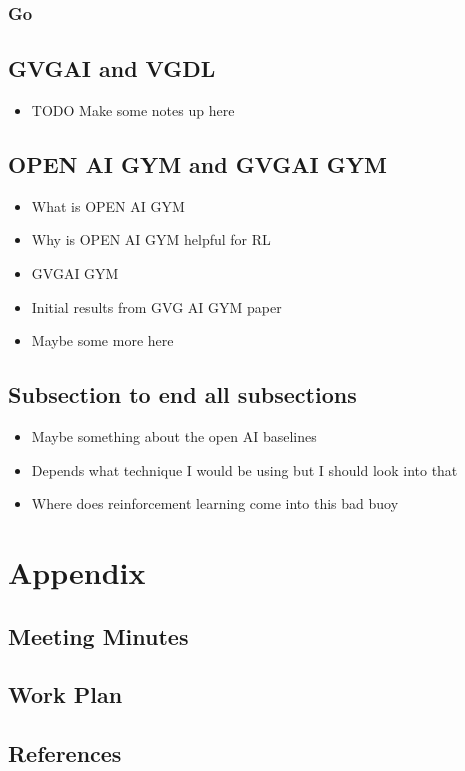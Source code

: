 \documentclass[a4paper]{article}
\begin{document}
\subsubsection{Go}


\subsection{GVGAI and VGDL}
\begin{itemize}
    \item TODO Make some notes up here
\end{itemize}
\subsection{OPEN AI GYM and GVGAI GYM}
\begin{itemize}
    \item What is OPEN AI GYM
    \item Why is OPEN AI GYM helpful for RL
    \item GVGAI GYM
    \item Initial results from GVG AI GYM paper
    \item Maybe some more here
\end{itemize}\cite{GVGAIGYM}

\subsection{Subsection to end all subsections}
\begin{itemize}
    \item Maybe something about the open AI baselines
    \item Depends what technique I would be using but I should look into that
    \item Where does reinforcement learning come into this bad buoy
\end{itemize}


\pagebreak
\section{Appendix}

\subsection{Meeting Minutes}


\pagebreak
\subsection{Work Plan}


\subsection{References}


\end{document}

